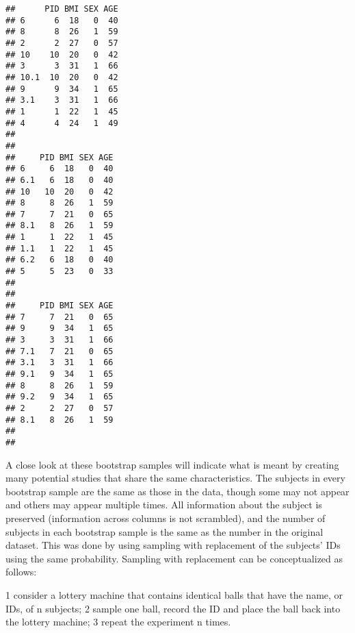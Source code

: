 \documentclass[]{article}
\begin{document}
\begin{verbatim}
##      PID BMI SEX AGE
## 6      6  18   0  40
## 8      8  26   1  59
## 2      2  27   0  57
## 10    10  20   0  42
## 3      3  31   1  66
## 10.1  10  20   0  42
## 9      9  34   1  65
## 3.1    3  31   1  66
## 1      1  22   1  45
## 4      4  24   1  49
##  
##  
##     PID BMI SEX AGE
## 6     6  18   0  40
## 6.1   6  18   0  40
## 10   10  20   0  42
## 8     8  26   1  59
## 7     7  21   0  65
## 8.1   8  26   1  59
## 1     1  22   1  45
## 1.1   1  22   1  45
## 6.2   6  18   0  40
## 5     5  23   0  33
##  
##  
##     PID BMI SEX AGE
## 7     7  21   0  65
## 9     9  34   1  65
## 3     3  31   1  66
## 7.1   7  21   0  65
## 3.1   3  31   1  66
## 9.1   9  34   1  65
## 8     8  26   1  59
## 9.2   9  34   1  65
## 2     2  27   0  57
## 8.1   8  26   1  59
##  
## 
\end{verbatim}

A close look at these bootstrap samples will indicate what is meant by
creating many potential studies that share the same characteristics. The
subjects in every bootstrap sample are the same as those in the data,
though some may not appear and others may appear multiple times. All
information about the subject is preserved (information across columns
is not scrambled), and the number of subjects in each bootstrap sample
is the same as the number in the original dataset. This was done by
using sampling with replacement of the subjects' IDs using the same
probability. Sampling with replacement can be conceptualized as follows:

1 consider a lottery machine that contains identical balls that have the
name, or IDs, of n subjects; 2 sample one ball, record the ID and place
the ball back into the lottery machine; 3 repeat the experiment n times.
\end{document}
